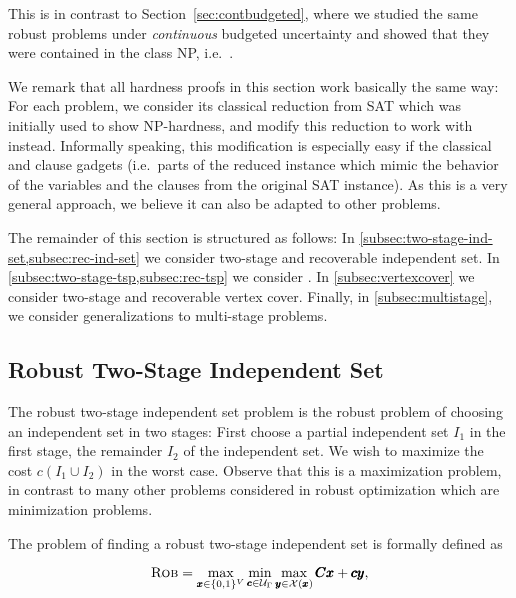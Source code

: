 This is in contrast to Section~\ref{sec:contbudgeted}, where we studied the same robust problems under \emph{continuous} budgeted uncertainty and showed that they were contained in the class NP, i.e.\ .

We remark that all hardness proofs in this section work basically the same way: For each problem, we consider its classical reduction from SAT which was initially used to show NP-hardness, and modify this reduction to work with {\radj} instead. Informally speaking, this modification is especially easy if the classical  and clause gadgets (i.e.\ parts of the reduced instance which mimic the behavior of the variables and the clauses from the original SAT instance). As this is a very general approach, we believe it can also be adapted to other problems.

The remainder of this section is structured as follows: In \cref{subsec:two-stage-ind-set,subsec:rec-ind-set} we consider two-stage and recoverable independent set. In \cref{subsec:two-stage-tsp,subsec:rec-tsp} we consider . In \cref{subsec:vertexcover} we consider two-stage and recoverable vertex cover. Finally, in \cref{subsec:multistage}, we consider generalizations to multi-stage problems.



\subsection{Robust Two-Stage Independent Set}
\label{subsec:two-stage-ind-set}


The robust two-stage independent set problem is the robust problem of choosing an independent set in two stages: First choose a partial independent set $I_1$ in the first stage,  the remainder $I_2$ of the independent set. We wish to maximize the cost $c(I_1 \cup I_2)$ in the worst case. Observe that this is a maximization problem, in contrast to many other problems considered in robust optimization which are minimization problems.

 The problem of finding a robust two-stage independent set is formally defined as

\begin{equation*}
\textsc{Rob} = \max_{\pmb x \in \{ 0,1 \}^V} \min_{\pmb c \in \mathcal{U}_\Gamma } \max_{\pmb y \in \mathcal{X}(\pmb x)} \pmb C \pmb x + \pmb c \pmb y, 
\end{equation*} 

